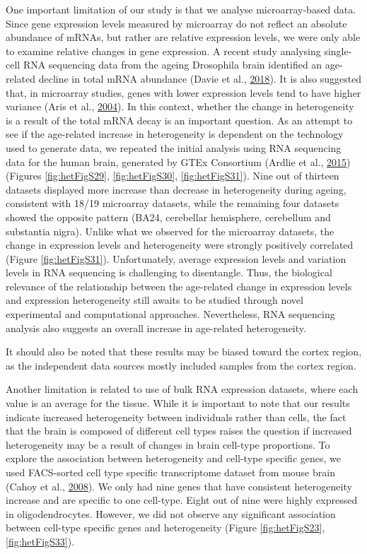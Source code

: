 \documentclass[12pt,twoside]{unicam}
\begin{document}
One important limitation of our study is that we analyse microarray-based data. Since gene expression levels measured by microarray do not reflect an absolute abundance of mRNAs, but rather are relative expression levels, we were only able to examine relative changes in gene expression. A recent study analysing single-cell RNA sequencing data from the ageing Drosophila brain identified an age-related decline in total mRNA abundance (Davie et al., \protect\hyperlink{ref-Davie2018}{2018}). It is also suggested that, in microarray studies, genes with lower expression levels tend to have higher variance (Aris et al., \protect\hyperlink{ref-Aris2004}{2004}). In this context, whether the change in heterogeneity is a result of the total mRNA decay is an important question. As an attempt to see if the age-related increase in heterogeneity is dependent on the technology used to generate data, we repeated the initial analysis using RNA sequencing data for the human brain, generated by GTEx Consortium (Ardlie et al., \protect\hyperlink{ref-Ardlie2015}{2015}) (Figures \ref{fig:hetFigS29}, \ref{fig:hetFigS30}, \ref{fig:hetFigS31}). Nine out of thirteen datasets displayed more increase than decrease in heterogeneity during ageing, consistent with 18/19 microarray datasets, while the remaining four datasets showed the opposite pattern (BA24, cerebellar hemisphere, cerebellum and substantia nigra). Unlike what we observed for the microarray datasets, the change in expression levels and heterogeneity were strongly positively correlated (Figure \ref{fig:hetFigS31}). Unfortunately, average expression levels and variation levels in RNA sequencing is challenging to disentangle. Thus, the biological relevance of the relationship between the age-related change in expression levels and expression heterogeneity still awaits to be studied through novel experimental and computational approaches. Nevertheless, RNA sequencing analysis also suggests an overall increase in age-related heterogeneity.

It should also be noted that these results may be biased toward the cortex region, as the independent data sources mostly included samples from the cortex region.

Another limitation is related to use of bulk RNA expression datasets, where each value is an average for the tissue. While it is important to note that our results indicate increased heterogeneity between individuals rather than cells, the fact that the brain is composed of different cell types raises the question if increased heterogeneity may be a result of changes in brain cell-type proportions. To explore the association between heterogeneity and cell-type specific genes, we used FACS-sorted cell type specific transcriptome dataset from mouse brain (Cahoy et al., \protect\hyperlink{ref-Cahoy2008}{2008}). We only had nine genes that have consistent heterogeneity increase and are specific to one cell-type. Eight out of nine were highly expressed in oligodendrocytes. However, we did not observe any significant association between cell-type specific genes and heterogeneity (Figure \ref{fig:hetFigS23}, \ref{fig:hetFigS33}).
\end{document}
